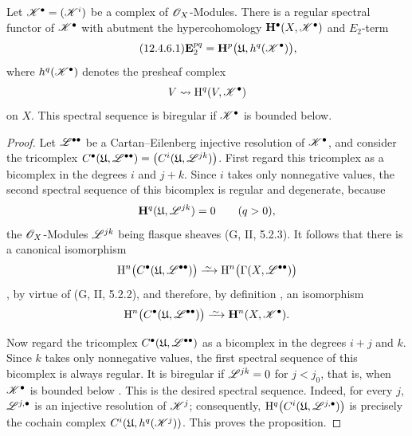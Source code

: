 \begin{proposition}[12.4.6]
\label{0.12.4.6}
Let $\mathscr{K}^\bullet=(\mathscr{K}^i)$ be a complex of
$\mathscr{O}_X$-Modules.
There is a regular spectral functor of $\mathscr{K}^\bullet$ with
abutment the hypercohomology $\mathbf{H}^\bullet(X,\mathscr{K}^\bullet)$ and $E_2$-term
\begin{equation}
\label{0.12.4.6.1}
\tag{12.4.6.1}
  \mathbf{E}_2^{pq}
  =
  \mathbf{H}^p\bigl(\mathfrak{U},h^q(\mathscr{K}^\bullet)\bigr),
\end{equation}
where $h^q(\mathscr{K}^\bullet)$ denotes the presheaf complex
\[
  V\leadsto\mathrm{H}^q(V,\mathscr{K}^\bullet)
\]
on $X$.
This spectral sequence is biregular if $\mathscr{K}^\bullet$ is bounded
below.
\end{proposition}

\begin{proof}
Let $\mathscr{L}^{\bullet\bullet}$ be a Cartan--Eilenberg injective
resolution of $\mathscr{K}^\bullet$, and consider the tricomplex $C^\bullet
(\mathfrak{U},\mathscr{L}^{\bullet\bullet})
=
\bigl(C^i
(\mathfrak{U},\mathscr{L}^{jk})\bigr)$.
First regard this tricomplex as a bicomplex in the degrees $i$ and
$j+k$.
Since $i$ takes only nonnegative values, the second spectral sequence
of this bicomplex is regular  and degenerate, because
\[
  \mathbf{H}^q(\mathfrak{U},\mathscr{L}^{jk})=0
  \qquad(q>0),
\]
the $\mathscr{O}_X$-Modules $\mathscr{L}^{jk}$ being flasque sheaves
(G, II, 5.2.3).
It follows that there is a canonical isomorphism
\[
  \HH^n\bigl(
    C^\bullet
      (\mathfrak{U},\sh{L}^{\bullet\bullet})
  \bigr)
  \isoto
  \HH^n\bigl(\Gamma(X,\sh{L}^{\bullet\bullet})\bigr)
\]
, by virtue of (G, II, 5.2.2), and therefore, by
definition , an isomorphism
\[
  \HH^n\bigl(
    C^\bullet
      (\mathfrak{U},\sh{L}^{\bullet\bullet})
  \bigr)
  \isoto
  \bb{H}^n(X,\sh{K}^\bullet).
\]

Now regard the tricomplex
$C^\bullet
(\mathfrak{U},\mathscr{L}^{\bullet\bullet})$
as a bicomplex in the degrees $i+j$ and $k$.
Since $k$ takes only nonnegative values, the first spectral sequence
of this bicomplex is always regular.
It is biregular if $\mathscr{L}^{jk}=0$ for $j<j_0$, that is, when
$\mathscr{K}^\bullet$ is bounded below .
This is the desired spectral sequence.
Indeed, for every $j$, $\mathscr{L}^{j,\bullet}$ is an injective
resolution of $\mathscr{K}^j$; consequently, $\mathrm{H}^q\bigl(
C^i
(\mathfrak{U},\mathscr{L}^{j,\bullet})
\bigr)$
is precisely the cochain complex
$C^i(\mathfrak{U},h^q(\mathscr{K}^j))$.
This proves the proposition.
\end{proof}

